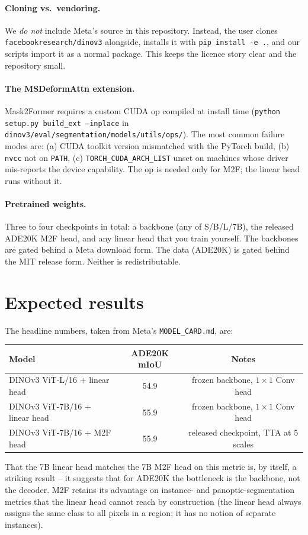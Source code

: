 \documentclass[11pt,a4paper]{article}
\begin{document}
\paragraph{Cloning vs.\ vendoring.} We \emph{do not} include Meta's source
in this repository. Instead, the user clones
\texttt{facebookresearch/dinov3} alongside, installs it with
\texttt{pip install -e .}, and our scripts import it as a normal package.
This keeps the licence story clear and the repository small.

\paragraph{The MSDeformAttn extension.} Mask2Former requires a custom CUDA
op compiled at install time (\texttt{python setup.py build\_ext --inplace}
in \texttt{dinov3/eval/segmentation/models/utils/ops/}). The most common
failure modes are: (a) CUDA toolkit version mismatched with the PyTorch
build, (b) \texttt{nvcc} not on \texttt{PATH}, (c)
\texttt{TORCH\_CUDA\_ARCH\_LIST} unset on machines whose driver
mis-reports the device capability. The op is needed only for M2F; the
linear head runs without it.

\paragraph{Pretrained weights.} Three to four checkpoints in total: a
backbone (any of S/B/L/7B), the released ADE20K M2F head, and any linear
head that you train yourself. The backbones are gated behind a Meta
download form. The data (ADE20K) is gated behind the MIT release form.
Neither is redistributable.

\section{Expected results}

The headline numbers, taken from Meta's \texttt{MODEL\_CARD.md}, are:
\begin{center}\small
\begin{tabular}{lcc}
\toprule
Model & ADE20K mIoU & Notes \\
\midrule
DINOv3 ViT-L/16 + linear head      & 54.9 & frozen backbone, $1{\times}1$ Conv head \\
DINOv3 ViT-7B/16 + linear head     & 55.9 & frozen backbone, $1{\times}1$ Conv head \\
DINOv3 ViT-7B/16 + M2F head        & 55.9 & released checkpoint, TTA at 5 scales \\
\bottomrule
\end{tabular}
\end{center}
That the 7B linear head matches the 7B M2F head on this metric is, by
itself, a striking result -- it suggests that for ADE20K the bottleneck is
the backbone, not the decoder. M2F retains its advantage on instance- and
panoptic-segmentation metrics that the linear head cannot reach by
construction (the linear head always assigns the same class to all pixels
in a region; it has no notion of separate instances).
\end{document}

